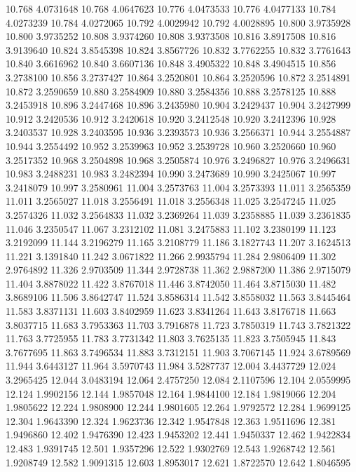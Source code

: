10.768 4.0731648
10.768 4.0647623
10.776 4.0473533
10.776 4.0477133
10.784 4.0273239
10.784 4.0272065
10.792 4.0029942
10.792 4.0028895
10.800 3.9735928
10.800 3.9735252
10.808 3.9374260
10.808 3.9373508
10.816 3.8917508
10.816 3.9139640
10.824 3.8545398
10.824 3.8567726
10.832 3.7762255
10.832 3.7761643
10.840 3.6616962
10.840 3.6607136
10.848 3.4905322
10.848 3.4904515
10.856 3.2738100
10.856 3.2737427
10.864 3.2520801
10.864 3.2520596
10.872 3.2514891
10.872 3.2590659
10.880 3.2584909
10.880 3.2584356
10.888 3.2578125
10.888 3.2453918
10.896 3.2447468
10.896 3.2435980
10.904 3.2429437
10.904 3.2427999
10.912 3.2420536
10.912 3.2420618
10.920 3.2412548
10.920 3.2412396
10.928 3.2403537
10.928 3.2403595
10.936 3.2393573
10.936 3.2566371
10.944 3.2554887
10.944 3.2554492
10.952 3.2539963
10.952 3.2539728
10.960 3.2520660
10.960 3.2517352
10.968 3.2504898
10.968 3.2505874
10.976 3.2496827
10.976 3.2496631
10.983 3.2488231
10.983 3.2482394
10.990 3.2473689
10.990 3.2425067
10.997 3.2418079
10.997 3.2580961
11.004 3.2573763
11.004 3.2573393
11.011 3.2565359
11.011 3.2565027
11.018 3.2556491
11.018 3.2556348
11.025 3.2547245
11.025 3.2574326
11.032 3.2564833
11.032 3.2369264
11.039 3.2358885
11.039 3.2361835
11.046 3.2350547
11.067 3.2312102
11.081 3.2475883
11.102 3.2380199
11.123 3.2192099
11.144 3.2196279
11.165 3.2108779
11.186 3.1827743
11.207 3.1624513
11.221 3.1391840
11.242 3.0671822
11.266 2.9935794
11.284 2.9806409
11.302 2.9764892
11.326 2.9703509
11.344 2.9728738
11.362 2.9887200
11.386 2.9715079
11.404 3.8878022
11.422 3.8767018
11.446 3.8742050
11.464 3.8715030
11.482 3.8689106
11.506 3.8642747
11.524 3.8586314
11.542 3.8558032
11.563 3.8445464
11.583 3.8371131
11.603 3.8402959
11.623 3.8341264
11.643 3.8176718
11.663 3.8037715
11.683 3.7953363
11.703 3.7916878
11.723 3.7850319
11.743 3.7821322
11.763 3.7725955
11.783 3.7731342
11.803 3.7625135
11.823 3.7505945
11.843 3.7677695
11.863 3.7496534
11.883 3.7312151
11.903 3.7067145
11.924 3.6789569
11.944 3.6443127
11.964 3.5970743
11.984 3.5287737
12.004 3.4437729
12.024 3.2965425
12.044 3.0483194
12.064 2.4757250
12.084 2.1107596
12.104 2.0559995
12.124 1.9902156
12.144 1.9857048
12.164 1.9844100
12.184 1.9819066
12.204 1.9805622
12.224 1.9808900
12.244 1.9801605
12.264 1.9792572
12.284 1.9699125
12.304 1.9643390
12.324 1.9623736
12.342 1.9547848
12.363 1.9511696
12.381 1.9496860
12.402 1.9476390
12.423 1.9453202
12.441 1.9450337
12.462 1.9422834
12.483 1.9391745
12.501 1.9357296
12.522 1.9302769
12.543 1.9268742
12.561 1.9208749
12.582 1.9091315
12.603 1.8953017
12.621 1.8722570
12.642 1.8046595
